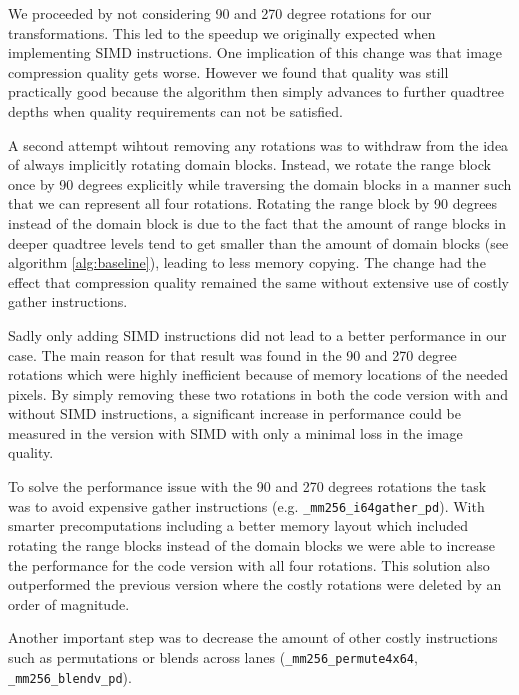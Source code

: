 We proceeded by not considering 90 and 270 degree rotations for our transformations.
This led to the speedup we originally expected when implementing SIMD instructions.
One implication of this change was that image compression quality gets worse. However we found that quality
was still practically good because the algorithm then simply advances to further quadtree
depths when quality requirements can not be satisfied.

A second attempt wihtout removing any rotations was to withdraw from the idea of always implicitly rotating domain blocks.
Instead, we rotate the range block once by 90 degrees explicitly while traversing the domain blocks
in a manner such that we can represent all four rotations.
Rotating the range block by 90 degrees instead of the domain block is due to the fact that the amount of range blocks
in deeper quadtree levels tend to get smaller than the amount of domain blocks (see algorithm \ref{alg:baseline}),
leading to less memory copying.
The change had the effect that compression quality remained the same without extensive use of costly
gather instructions.

Sadly only adding SIMD instructions did not lead to a better performance in our
case. The main reason for that result was found in the 90 and 270 degree
rotations which were highly inefficient because of memory locations of the
needed pixels. By simply removing these two rotations in both the code version
with and without SIMD instructions, a significant increase in performance could
be measured in the version with SIMD with only a minimal loss in the image
quality.

To solve the performance issue with the 90 and 270 degrees rotations the task
was to avoid expensive gather instructions (e.g. \verb|_mm256_i64gather_pd|).
With smarter precomputations including a better memory layout which included
rotating the range blocks instead of the domain blocks we were able to increase
the performance for the code version with all four rotations. This solution also
outperformed the previous version where the costly rotations were deleted by an
order of magnitude.

Another important step was to decrease the amount of other costly instructions
such as permutations or blends across lanes (\verb|_mm256_permute4x64|,
\verb|_mm256_blendv_pd|).
